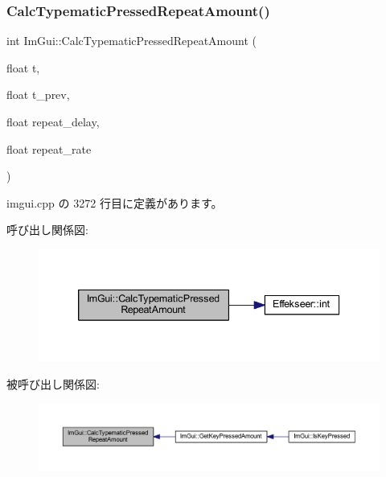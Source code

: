 \subsubsection{\texorpdfstring{Calc\+Typematic\+Pressed\+Repeat\+Amount()}{CalcTypematicPressedRepeatAmount()}}
{\footnotesize\ttfamily int Im\+Gui\+::\+Calc\+Typematic\+Pressed\+Repeat\+Amount (\begin{DoxyParamCaption}\item[{float}]{t,  }\item[{float}]{t\+\_\+prev,  }\item[{float}]{repeat\+\_\+delay,  }\item[{float}]{repeat\+\_\+rate }\end{DoxyParamCaption})}



 imgui.\+cpp の 3272 行目に定義があります。

呼び出し関係図\+:\nopagebreak
\begin{figure}[H]
\begin{center}
\leavevmode
\includegraphics[width=339pt]{namespace_im_gui_ad3af0fc327467a44116d7d04018b9124_cgraph}
\end{center}
\end{figure}
被呼び出し関係図\+:\nopagebreak
\begin{figure}[H]
\begin{center}
\leavevmode
\includegraphics[width=350pt]{namespace_im_gui_ad3af0fc327467a44116d7d04018b9124_icgraph}
\end{center}
\end{figure}
\mbox{\label{namespace_im_gui_a66416151e58c34cd02973976de66e0e9}} 
